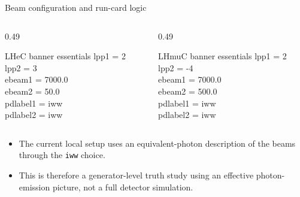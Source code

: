 \documentclass[aspectratio=1610,english]{beamer}
\begin{document}
\begin{frame}[fragile]{Beam configuration and run-card logic}
\begin{columns}[T]
\begin{column}{0.49\textwidth}
\begin{block}{LHeC banner essentials}
\scriptsize\ttfamily
lpp1 = 2\\
lpp2 = 3\\
ebeam1 = 7000.0\\
ebeam2 = 50.0\\
pdlabel1 = iww\\
pdlabel2 = iww
\end{block}
\end{column}
\begin{column}{0.49\textwidth}
\begin{block}{LHmuC banner essentials}
\scriptsize\ttfamily
lpp1 = 2\\
lpp2 = -4\\
ebeam1 = 7000.0\\
ebeam2 = 500.0\\
pdlabel1 = iww\\
pdlabel2 = iww
\end{block}
\end{column}
\end{columns}
\vspace{1cm}
\begin{itemize}
\justifying
\item The current local setup uses an equivalent-photon description of the beams through the \texttt{iww} choice.
\item This is therefore a generator-level truth study using an effective photon-emission picture, not a full detector simulation.
\end{itemize}
\end{frame}
\end{document}
